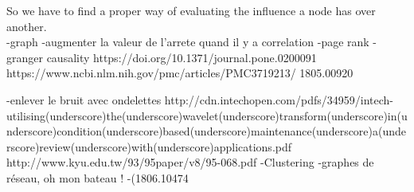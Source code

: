 \documentclass[10pt,a4paper,oneside]{article}
\begin{document}
\vspace{0.8cm}

\begin{multicols}{2}

So we have to find a proper way of evaluating the influence a node has over another.\\
-graph
-augmenter la valeur de l'arrete quand il y a correlation
-page rank
-granger causality
https://doi.org/10.1371/journal.pone.0200091
https://www.ncbi.nlm.nih.gov/pmc/articles/PMC3719213/
1805.00920


\end{multicols}
-enlever le bruit avec ondelettes 
http://cdn.intechopen.com/pdfs/34959/intech-utilising(underscore)the(underscore)wavelet(underscore)transform(underscore)in(underscore)condition(underscore)based(underscore)maintenance(underscore)a(underscore)review(underscore)with(underscore)applications.pdf
http://www.kyu.edu.tw/93/95paper/v8/95-068.pdf
-Clustering
-graphes de réseau, oh mon bateau !
-(1806.10474
\end{document}
